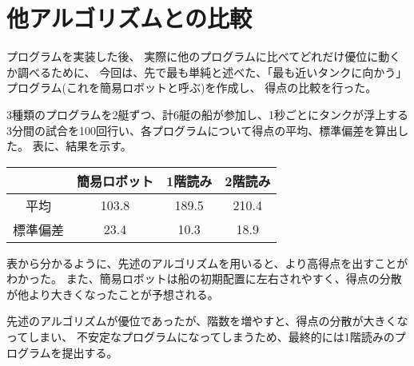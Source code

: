 \documentclass[]{jsarticle}
\begin{document}
\section{他アルゴリズムとの比較}
    プログラムを実装した後、
    実際に他のプログラムに比べてどれだけ優位に動くか調べるために、
    今回は、先で最も単純と述べた、「最も近いタンクに向かう」プログラム(これを簡易ロボットと呼ぶ)を作成し、
    得点の比較を行った。

    3種類のプログラムを2艇ずつ、計6艇の船が参加し、1秒ごとにタンクが浮上する
    3分間の試合を100回行い、各プログラムについて得点の平均、標準偏差を算出した。
    表に、結果を示す。

    \begin{table}[ht]
        \centering
        \begin{tabular}{c|ccc}
            & 簡易ロボット & 1階読み & 2階読み \\ \hline
            平均 & 103.8 & 189.5 & 210.4 \\
            標準偏差 & 23.4 & 10.3 & 18.9 \\
        \end{tabular}
    \end{table}

    表から分かるように、先述のアルゴリズムを用いると、より高得点を出すことがわかった。
    また、簡易ロボットは船の初期配置に左右されやすく、得点の分散が他より大きくなったことが予想される。

    先述のアルゴリズムが優位であったが、階数を増やすと、得点の分散が大きくなってしまい、
    不安定なプログラムになってしまうため、最終的には1階読みのプログラムを提出する。
\end{document}

